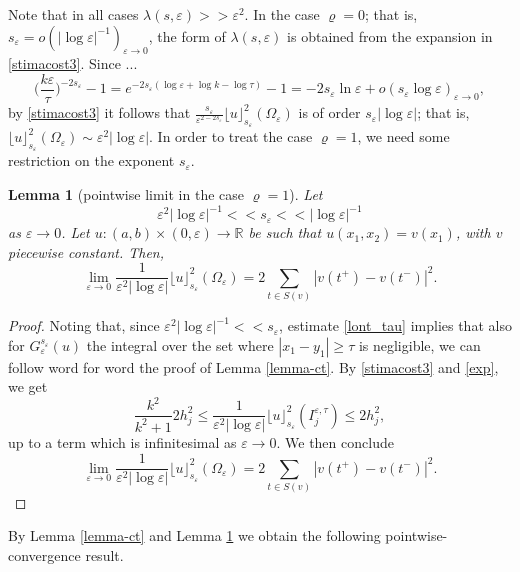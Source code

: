 \documentclass[11pt]{article}
\newtheorem{lemma}[definition]{Lemma}
\def\e{\varepsilon}
\begin{document}
Note that in all cases $\lambda(s,\e)>\!>\e^2$. 
In the case $\varrho=0$; that is, $s_\e=o(|\log\e|^{-1})_{\e\to 0}$, the form of $\lambda(s,\e)$ is obtained from the expansion in \eqref{stimacost3}. Since ...  
\begin{equation}\label{exp}
\Big(\frac{k\e}{\tau}\Big)^{-2s_\e}-1=e^{-2s_\e(\log \e+\log k-\log\tau)}-1=-2s_\e\ln \e
+o(s_\e\log\e)_{\e\to 0},
\end{equation}
by \eqref{stimacost3} it follows that $\frac{s_\e}{\e^{2-2s_\e}}\lfloor u\rfloor_{s_\e}^2(\Omega_\e)$ is of order $s_\e|\log \e|$; that is, $\lfloor u\rfloor_{s_\e}^2(\Omega_\e)\sim \e^{2}|\log \e|$. 
In order to treat the case $\varrho=1$, we need some restriction on the exponent $s_\e$. 
\begin{lemma}[pointwise limit in the case $\varrho=1$]\label{lemma-log}   
Let 
$$\e^2 |\log\e|^{-1} <\!<s_\e<\!< |\log\e|^{-1}$$ 
as $\e\to 0$.  
Let $u\colon (a,b)\times (0,\e)\to \mathbb R$ be such that $u(x_1,x_2)=v(x_1)$, with 
$v$ piecewise constant. 
Then,
$$\lim_{\e\to 0} \frac{1}{\e^2|\log\e|}\lfloor u \rfloor^2_{s_\e}(\Omega_\e)=2\sum_{t\in S(v)} |v(t^+)-v(t^-)|^2.$$ 
\end{lemma} 
\begin{proof}
Noting that, since $\e^2 |\log\e|^{-1} <\!<s_\e$, estimate \eqref{lont_tau} implies that also for $G^{s_\e}_\e(u)$ the integral over the set where $|x_1-y_1|\geq\tau$ is negligible, we can follow word for word the proof of Lemma \ref{lemma-ct}. 
By \eqref{stimacost3} and \eqref{exp}, we get 
\begin{equation}\label{stimaG1}
\frac{k^2}{k^2+1}2h_j^2 \leq 
\frac{1}{\e^2|\log\e|}\lfloor u \rfloor^2_{s_\e}(I_{j}^{\e,\tau})
\leq 2h_j^2, 
\end{equation}
up to a term which is infinitesimal as $\e\to 0$. 
We then conclude 
$$\lim_{\e\to 0} \frac{1}{\e^2|\log\e|}\lfloor u \rfloor^2_{s_\e}(\Omega_\e)=2\sum_{t\in S(v)} |v(t^+)-v(t^-)|^2.$$
\end{proof} 

By Lemma \ref{lemma-ct} and Lemma \ref{lemma-log} we obtain the following pointwise-convergence result. 
\end{document}
